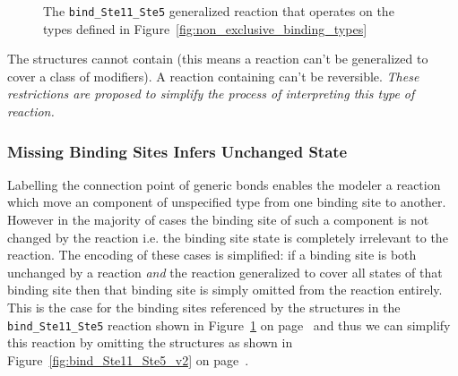 \documentclass{cekarticle}
\begin{document}
\begin{figure}[h]
  \caption{The \texttt{bind\_Ste11\_Ste5} generalized reaction that operates on the types defined in
  Figure~\ref{fig:non_exclusive_binding_types}}
  \label{fig:bind_Ste11_Ste5}
\end{figure}

The  structures cannot contain
 (this means a reaction can't be generalized
to cover a class of modifiers).  A reaction containing
 can't be reversible.  \emph{These
restrictions are proposed to simplify the process of interpreting
this type of reaction.}

\clearpage
\subsubsection{Missing Binding Sites Infers Unchanged State}

Labelling the connection point of generic bonds enables the modeler a reaction which move an
component of unspecified type from one binding site to another.  However in the majority of cases
the binding site of such a component is not changed by the reaction i.e. the binding site state is
completely irrelevant to the reaction.  The encoding of these cases is simplified:  if a binding site
is both unchanged by a reaction \emph{and} the reaction generalized to cover all states of that
binding site then that binding site is simply omitted from the reaction entirely.  This
is the case for the binding sites referenced by the  structures in the
\texttt{bind\_Ste11\_Ste5} reaction shown in Figure~\ref{fig:bind_Ste11_Ste5} on
page~\pageref{fig:bind_Ste11_Ste5} and thus we can
simplify this reaction by omitting the  structures as shown in
Figure~\ref{fig:bind_Ste11_Ste5_v2} on page~\pageref{fig:bind_Ste11_Ste5_v2}.
\end{document}
